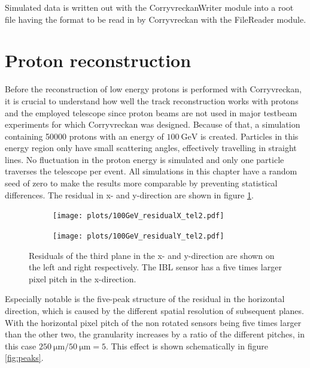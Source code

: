 Simulated data is written out with the CorryvreckanWriter module into a root file having the format to be read
in by Corryvreckan with the FileReader module.

\section{Proton reconstruction}\label{sec:proton_reconstruction}
Before the reconstruction of low energy protons is performed with Corryvreckan, it is crucial to understand how well the
track reconstruction works with protons and the employed telescope since proton beams are not used in major testbeam
experiments for which Corryvreckan was designed. Because of that, a simulation containing 50000 protons
with an energy of $\SI{100}{\giga\eV}$ is created.
Particles in this energy region only have small scattering angles, effectively travelling
in straight lines.
No fluctuation in the proton energy is simulated and only one particle traverses
the telescope per event. All simulations in this chapter have a random seed of zero to make the results more comparable by preventing
statistical differences.
The residual in x- and y-direction are shown in figure \ref{fig:100GeV}.

\begin{figure}
  \hspace{-2.5cm}
  \begin{subfigure}{0.62\textwidth}
      \centering
      \texttt{[image: plots/100GeV\_residualX\_tel2.pdf]}
  \end{subfigure}
  \begin{subfigure}{0.62\textwidth}
      \hspace{0.95cm}
      \texttt{[image: plots/100GeV\_residualY\_tel2.pdf]}
  \end{subfigure}
  \caption{Residuals of the third plane in the x- and y-direction are shown on the left and right respectively.
  The IBL sensor has a five times larger pixel pitch in the x-direction. }
  \label{fig:100GeV}
\end{figure}

Especially notable is the five-peak structure of the residual in the horizontal direction, which is caused by the different
spatial resolution of subsequent planes. With the horizontal pixel pitch of the non rotated sensors being
five times larger than the other two, the granularity increases by a ratio of the different pitches, in this case
$\SI{250}{\micro\meter}/\SI{50}{\micro\meter} = 5$. This effect is shown schematically in figure \ref{fig:peaks}.

